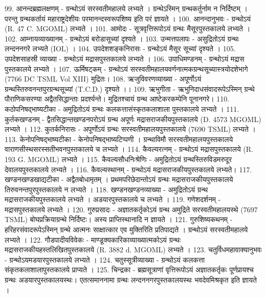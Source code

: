 99. आनन्दब्रह्मलक्षणम् - ग्रन्थोऽयं सरस्वतीमहालये लभ्यते । ग्रन्थेऽस्मिन् ग्रन्थकर्तुर्नाम न निर्दिष्टम् । परन्तु ग्रन्थकर्तायं महाराष्ट्रदेशीयः परमानन्दस्वरूपशिष्य इति परं ज्ञायते । 
100. आनन्दानुभवः - ग्रन्थोऽयं (R. 47 C. MGOML) लभ्यते ।
101. आमोदः - सूत्रवृत्तिरूपोऽयं ग्रन्थः मैसूरपुस्तकालये लभ्यते । 
102. आम्नायव्याख्यानम् - ग्रन्थोऽयं बरोडासूच्यां दृश्यते । 
103. उन्मत्तपलापः - असुद्रितोऽयं ग्रन्थः लन्दननगरे लभ्यते (IOL) ।
104. उपदेशशङ्कनिरासः - ग्रन्थोऽयं मैसूर सूच्यां दृश्यते । 
105. उपदेशसाहस्री व्याख्या - ग्रन्थोऽयं मद्रासपुस्तकालये लभ्यते । 
106. उपाधिमण्डनम् - ग्रन्थोऽयं मद्रास पुस्तकालये लभ्यते ।
107. ऊर्मिषट्कम् - ग्रन्थोऽयं सरस्वतीमहालयवर्णनात्मकग्रन्थसूच्यास्त्रयोदशेभागे (7766 DC TSML Vol XIII) मुद्रितः।
108. ऋजुविवरणव्याख्या - अपूर्णोऽयं ग्रन्थस्तिरुवनन्तपुरग्रन्थसूच्यां (T.C.D.) दृश्यते ।। 
109. ऋभुगीता - ऋभुनिदाधसंवादरूपेऽस्मिन् ग्रन्थे पौराणिकसरण्या अद्वैतसिद्धान्ताः प्रदर्श्यन्ते। मुद्रितश्चायं ग्रन्थ आष्टेकरकम्पेनि पूनानगरे। 
110. कठोपनिषद्भाष्यटीका - अमुद्रितोऽयं ग्रन्थः कलकत्तासंस्कृतकलाशाला पुस्तकालये लभ्यते । 
111. कुर्तकखण्डनम् - द्वैतसिद्धान्तखण्डनपरोऽयं ग्रन्थ अपूर्णः मद्रासराजकीयपुस्तकालये (D. 4573 MGOML) लभ्यते । 
112. कुतर्कनिरासः - अपूर्णोऽयं ग्रन्थः सरस्वतीमहालयपुस्तकालये (7690 TSML) लभ्यते । 
113. केनोपनिषद्भाष्यटीका -
	केनोपनिषद्भाष्यटिप्पणी । ग्रन्थाविमौ सरस्वतीमहालयपुस्तकालये वाराणसीस्थसरस्सतीभवनपुस्तकालये च लभ्यते । 
114. कैवल्यरत्नम् - ग्रन्थोऽयं मद्रासपुस्तकालये (R. 193 G. MGOML) लभ्यते ।
115. कैवल्यसौधनिःश्रेणिः - अमुद्रितोऽयं ग्रन्थस्तिरुविडमरुदूर देवालयपुस्तकालये लभ्यते । 
116. कैवल्यस्थानम् - ग्रन्थोऽयं मद्रासराजकीयपुस्तकालये लभ्यते। 
117. खण्डनखण्डखाद्यटीका - अद्वैतबोधामृतम् । प्रथमपरिछेदान्तोऽयं ग्रन्थः मद्रासराजकीयपुस्तकालये तिरुवनन्तपुरपुस्तकालये न लभ्यते । 
118. खण्डनखण्डनव्याख्या - अमुद्रितोऽयं ग्रन्थ मद्रासराजकीयपुस्तकालये लभ्यते । अडयारपुस्तकालये च लभ्यते । 
119. गणेशदर्शनम् - मद्रासपुस्तकालये लभ्यते । 
120. गुरुप्रसादः - अज्ञातकर्तृकोऽयं ग्रन्थ अमुद्रिते सरस्वतीमहालयस्थे (7697 TSML) बोघप्रक्रियाग्रन्थे निर्दिष्टः। अस्य प्राप्तिस्थानादि न ज्ञायते । 
121. गुरुशिष्यकथनम् - हरिहरसंवादरूपेऽस्मिन् ग्रन्थे आत्मनः साक्षात्कार एव मुक्तिरिति प्रतिपाद्यते । ग्रन्थोऽयं सरस्वतीमहालये लभ्यते । 
122. गौडपादीयविवेकः - माण्डूक्यकारिकाव्याख्यात्मकोऽयं ग्रन्थः मद्रासराजकीयहस्तलिखितपुस्तकालये (R. 3882 d. MGOML) लभ्यते । 
123. चतुर्विधमहावाक्यानुभवः - ग्रन्थोऽयमडयारपुस्तकालये लभ्यते ।
124. चतुस्सूत्रीव्याख्या - ग्रन्थोऽयं कलकत्ता संकृतकलाशालापुस्तकालये प्राप्यते । 
125. चिन्द्रका - ब्रह्मसूत्राणां वृत्तिरूपोऽयं अज्ञातकर्तृकः पूर्णप्रायश्च ग्रन्थः अडयारपुस्तकालयस्थः। एतत्समाननामा ग्रन्थः लन्दननगरपुस्तकालयस्थः भवदेवमिश्रकृत इति ज्ञायते । 
